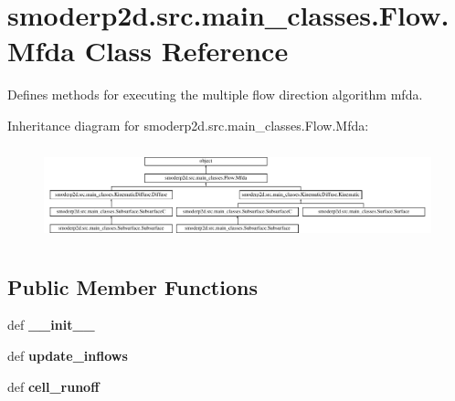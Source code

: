 \hypertarget{classsmoderp2d_1_1src_1_1main__classes_1_1Flow_1_1Mfda}{\section{smoderp2d.\-src.\-main\-\_\-classes.\-Flow.\-Mfda Class Reference}
\label{classsmoderp2d_1_1src_1_1main__classes_1_1Flow_1_1Mfda}
}


Defines methods for executing the multiple flow direction algorithm mfda.  


Inheritance diagram for smoderp2d.\-src.\-main\-\_\-classes.\-Flow.\-Mfda\-:\begin{figure}[H]
\begin{center}
\leavevmode
\includegraphics[height=2.753196cm]{classsmoderp2d_1_1src_1_1main__classes_1_1Flow_1_1Mfda}
\end{center}
\end{figure}
\subsection*{Public Member Functions}
\begin{DoxyCompactItemize}
\item 
\hypertarget{classsmoderp2d_1_1src_1_1main__classes_1_1Flow_1_1Mfda_ad82acdf6efe4e833d848dc65703b4bc8}{def {\bfseries \-\_\-\-\_\-init\-\_\-\-\_\-}}\label{classsmoderp2d_1_1src_1_1main__classes_1_1Flow_1_1Mfda_ad82acdf6efe4e833d848dc65703b4bc8}

\item 
\hypertarget{classsmoderp2d_1_1src_1_1main__classes_1_1Flow_1_1Mfda_aa15202947e215f0d25bbfb8b92864362}{def {\bfseries update\-\_\-inflows}}\label{classsmoderp2d_1_1src_1_1main__classes_1_1Flow_1_1Mfda_aa15202947e215f0d25bbfb8b92864362}

\item 
\hypertarget{classsmoderp2d_1_1src_1_1main__classes_1_1Flow_1_1Mfda_a10002cd66762a4b9a02e71d91a36cc57}{def {\bfseries cell\-\_\-runoff}}\label{classsmoderp2d_1_1src_1_1main__classes_1_1Flow_1_1Mfda_a10002cd66762a4b9a02e71d91a36cc57}

\end{DoxyCompactItemize}
